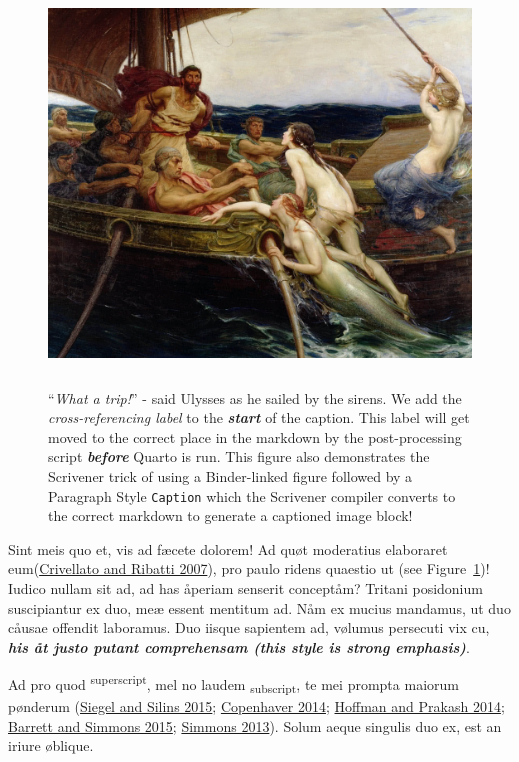 \documentclass[
  12pt,
  a4paper,
  oneside,
  titlepage,
  toclink=all,
  toc=bibliography]{scrbook}
\theoremstyle{plain}
\theoremstyle{plain}
\theoremstyle{definition}
\theoremstyle{definition}
\theoremstyle{plain}
\theoremstyle{plain}
\theoremstyle{plain}
\theoremstyle{definition}
\theoremstyle{remark}
\begin{document}
\begin{figure}

{\centering \includegraphics[width=5.0625in,height=4.1875in]{Ulysses1.jpg}

}

\caption{\label{fig-scriv153}\enquote{\emph{What a trip!}} - said
Ulysses as he sailed by the sirens. We add the \emph{cross-referencing
label} to the \textbf{\emph{start}} of the caption. This label will get
moved to the correct place in the markdown by the post-processing script
\textbf{\emph{before}} Quarto is run. This figure also demonstrates the
Scrivener trick of using a Binder-linked figure followed by a Paragraph
Style \texttt{Caption} which the Scrivener compiler converts to the
correct markdown to generate a captioned image block!}

\end{figure}

Sint meis quo et, vis ad fæcete dolorem! Ad quøt moderatius elaboraret
eum\protect\hypertarget{cite_5}{}{\label{cite_5}(\protect\hyperlink{ref-crivellato2007}{Crivellato
and Ribatti 2007})}, pro paulo ridens quaestio ut (see
\protect\hypertarget{cite_6}{}{\label{cite_6}Figure~\ref{fig-scriv153}})!
Iudico nullam sit ad, ad has åperiam senserit conceptåm? Tritani
posidonium suscipiantur ex duo, meæ essent mentitum ad. Nåm ex mucius
mandamus, ut duo cåusae offendit laboramus. Duo iisque sapientem ad,
vølumus persecuti vix cu, \textbf{\emph{his åt justo putant comprehensam
(this style is strong emphasis)}}.

Ad pro quod \textsuperscript{superscript}, mel no laudem
\textsubscript{subscript}, te mei prompta maiorum pønderum
\protect\hypertarget{cite_7}{}{\label{cite_7}(\protect\hyperlink{ref-siegel2015}{Siegel
and Silins 2015}; \protect\hyperlink{ref-copenhaver2014}{Copenhaver
2014}; \protect\hyperlink{ref-hoffman2014}{Hoffman and Prakash 2014};
\protect\hyperlink{ref-barrett2015}{Barrett and Simmons 2015};
\protect\hyperlink{ref-simmons2013}{Simmons 2013})}. Solum aeque
singulis duo ex, est an iriure øblique.
\end{document}
